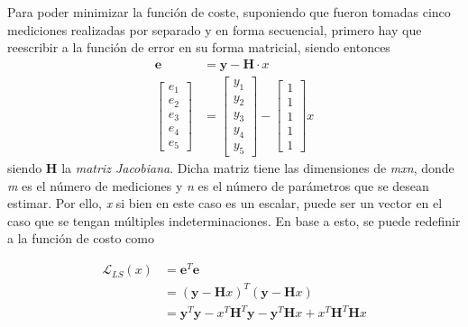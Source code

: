 
% 

Para poder minimizar la función de coste, suponiendo que fueron tomadas cinco mediciones realizadas por separado y en forma secuencial, primero hay que reescribir a la función de error en su forma matricial, siendo entonces
\begin{align}
    \textbf{e} &= \textbf{y} - \textbf{H}\cdot x \\
    \begin{bmatrix}
        e_1\\ e_2\\ e_3\\ e_4\\ e_5
    \end{bmatrix}
    &= 
    \begin{bmatrix}
        y_1\\ y_2\\ y_3\\ y_4\\ y_5
    \end{bmatrix}
    -
    \begin{bmatrix}
        1\\ 1\\ 1\\ 1\\ 1
    \end{bmatrix}
    x
\end{align}
siendo \textbf{H} la \textit{matriz Jacobiana}. Dicha matriz tiene las dimensiones de \textit{mxn}, donde \textit{m} es el número de mediciones y \textit{n} es el número de parámetros que se desean estimar. Por ello, \textit{x} si bien en este caso es un escalar, puede ser un vector en el caso que se tengan múltiples indeterminaciones. En base a esto, se puede redefinir a la función de costo como

\begin{align}
    \mathscr{L}_{LS}(x) &= \textbf{e}^T\textbf{e} \\
                        &= (\textbf{y} - \textbf{H}x)^T(\textbf{y} - \textbf{H}x) \\
                        &= \textbf{y}^T\textbf{y} - x^T\textbf{H}^T\textbf{y} - \textbf{y}^T\textbf{H}x + x^T\textbf{H}^T\textbf{H}x
\end{align}

